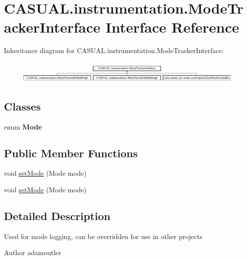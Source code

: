 \hypertarget{interface_c_a_s_u_a_l_1_1instrumentation_1_1_mode_tracker_interface}{\section{C\-A\-S\-U\-A\-L.\-instrumentation.\-Mode\-Tracker\-Interface Interface Reference}
\label{interface_c_a_s_u_a_l_1_1instrumentation_1_1_mode_tracker_interface}
}
Inheritance diagram for C\-A\-S\-U\-A\-L.\-instrumentation.\-Mode\-Tracker\-Interface\-:\begin{figure}[H]
\begin{center}
\leavevmode
\includegraphics[height=1.107814cm]{interface_c_a_s_u_a_l_1_1instrumentation_1_1_mode_tracker_interface}
\end{center}
\end{figure}
\subsection*{Classes}
\begin{DoxyCompactItemize}
\item 
enum {\bfseries Mode}
\end{DoxyCompactItemize}
\subsection*{Public Member Functions}
\begin{DoxyCompactItemize}
\item 
void \hyperlink{interface_c_a_s_u_a_l_1_1instrumentation_1_1_mode_tracker_interface_a3f4a0e410a7650e257fe9150f08343b2}{set\-Mode} (Mode mode)
\item 
void \hyperlink{interface_c_a_s_u_a_l_1_1instrumentation_1_1_mode_tracker_interface_a3f4a0e410a7650e257fe9150f08343b2}{set\-Mode} (Mode mode)
\end{DoxyCompactItemize}


\subsection{Detailed Description}
Used for mode logging, can be overridden for use in other projects \begin{DoxyAuthor}{Author}
adamoutler 
\end{DoxyAuthor}


